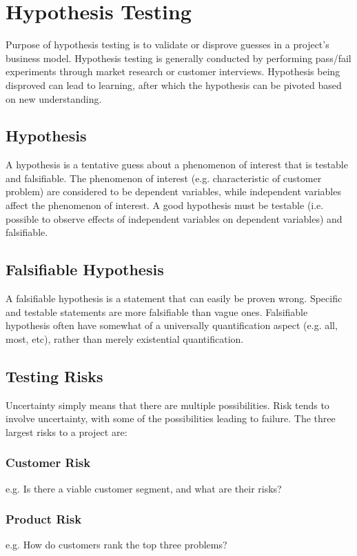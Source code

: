 \documentclass[12pt,titlepage]{article}
\begin{document}
  \section{Hypothesis Testing}
    Purpose of hypothesis testing is to validate or disprove guesses in a project's business model. Hypothesis testing is generally
    conducted by performing pass/fail experiments through market research or customer interviews. Hypothesis being disproved can lead
    to learning, after which the hypothesis can be pivoted based on new understanding.

    \subsection{Hypothesis}
      A hypothesis is a tentative guess about a phenomenon of interest that is testable and falsifiable. The phenomenon of interest
      (e.g. characteristic of customer problem) are considered to be dependent variables, while independent variables affect the
      phenomenon of interest. A good hypothesis must be testable (i.e. possible to observe effects of independent variables on
      dependent variables) and falsifiable.

      \subsection{Falsifiable Hypothesis}
        A falsifiable hypothesis is a statement that can easily be proven wrong. Specific and testable statements are more falsifiable
        than vague ones. Falsifiable hypothesis often have somewhat of a universally quantification aspect (e.g. all, most, etc), rather
        than merely existential quantification.

    \subsection{Testing Risks}
      Uncertainty simply means that there are multiple possibilities. Risk tends to involve uncertainty, with some of the possibilities
      leading to failure. The three largest risks to a project are:

        \subsubsection{Customer Risk}
          e.g. Is there a viable customer segment, and what are their risks?

        \subsubsection{Product Risk}
          e.g. How do customers rank the top three problems?
\end{document}
